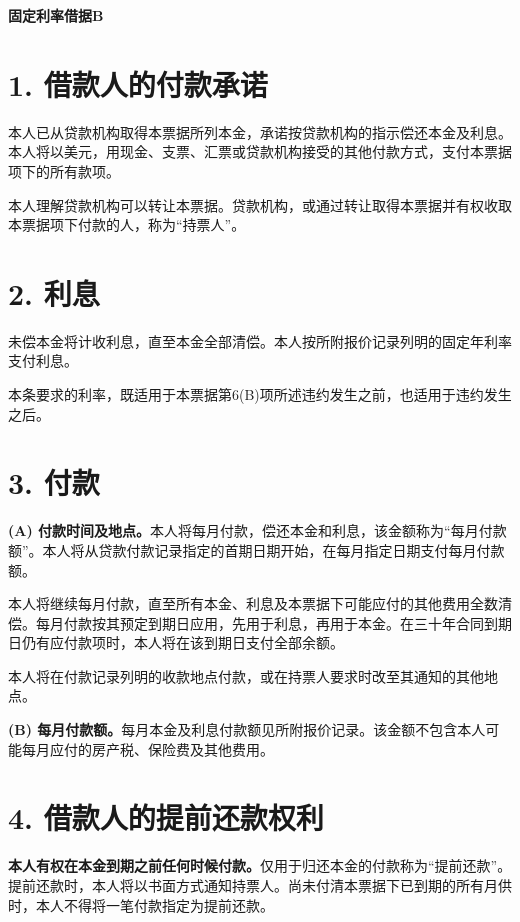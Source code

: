 \documentclass[UTF8,fontset=none,11pt,a4paper]{ctexart}
\begin{document}
{\noindent\fontsize{20}{25}\selectfont\bfseries 固定利率借据B\par}
\vspace{10pt}
\section*{1. 借款人的付款承诺}
本人已从贷款机构取得本票据所列本金，承诺按贷款机构的指示偿还本金及利息。本人将以美元，用现金、支票、汇票或贷款机构接受的其他付款方式，支付本票据项下的\allowbreak\mbox{所有款项。}


本人理解贷款机构可以转让本票据。贷款机构，或通过转让取得本票据并有权收取本票据项下付款的人，称为“持票人”。


\section*{2. 利息}
未偿本金将计收利息，直至本金全部清偿。本人按所附报价记录列明的固定年利率\allowbreak\mbox{支付利息。}


本条要求的利率，既适用于本票据第6(B)项所述违约发生之前，也适用于违约\allowbreak\mbox{发生之后。}


\section*{3. 付款}
\textbf{(A) 付款时间及地点。}本人将每月付款，偿还本金和利息，该金额称为“每月付款额”。本人将从贷款付款记录指定的首期日期开始，在每月指定日期支付每\allowbreak\mbox{月付款额。}


本人将继续每月付款，直至所有本金、利息及本票据下可能应付的其他费用全数清偿。每月付款按其预定到期日应用，先用于利息，再用于本金。在三十年合同到期日仍有应付款项时，本人将在该到期日支付\allowbreak\mbox{全部余额。}


本人将在付款记录列明的收款地点付款，或在持票人要求时改至其通知的\allowbreak\mbox{其他地点。}


\textbf{(B) 每月付款额。}每月本金及利息付款额见所附报价记录。该金额不包含本人可能每月应付的房产税、保险费及\allowbreak\mbox{其他费用。}


\section*{4. 借款人的提前还款权利}
\textbf{本人有权在本金到期之前任何时候付款。}仅用于归还本金的付款称为“提前还款”。提前还款时，本人将以书面方式通知持票人。尚未付清本票据下已到期的所有月供时，本人不得将一笔付款指定为\allowbreak\mbox{提前还款。}
\end{document}
